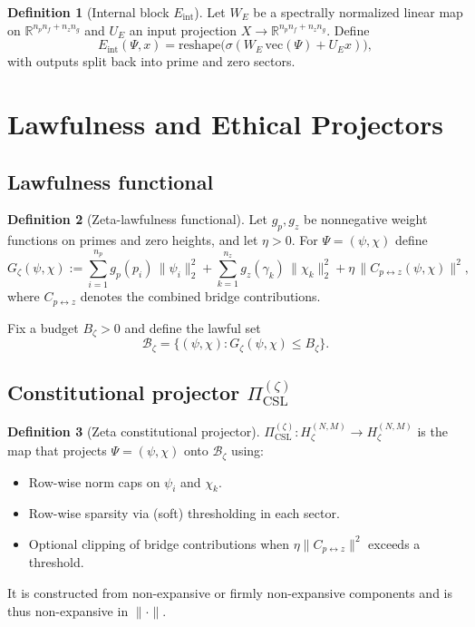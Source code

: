 \documentclass[11pt]{article}
\theoremstyle{definition}
\newtheorem{definition}{Definition}
\theoremstyle{plain}
\begin{document}
\begin{definition}[Internal block $E_{\mathrm{int}}$]
Let $W_E$ be a spectrally normalized linear map on $\mathbb{R}^{n_p n_f + n_z n_g}$ and $U_E$ an input projection $X \to \mathbb{R}^{n_p n_f + n_z n_g}$.
Define
\[
  E_{\mathrm{int}}(\Psi,x)
  = \mathrm{reshape}\bigl(\sigma(W_E\,\mathrm{vec}(\Psi) + U_E x)\bigr),
\]
with outputs split back into prime and zero sectors.
\end{definition}

\section{Lawfulness and Ethical Projectors}

\subsection{Lawfulness functional}

\begin{definition}[Zeta-lawfulness functional]
Let $g_p,g_z$ be nonnegative weight functions on primes and zero heights, and let $\eta>0$.
For $\Psi=(\psi,\chi)$ define
\[
  G_\zeta(\psi,\chi)
  :=
  \sum_{i=1}^{n_p} g_p(p_i)\,\|\psi_i\|_2^2
  + \sum_{k=1}^{n_z} g_z(\gamma_k)\,\|\chi_k\|_2^2
  + \eta\,\|C_{p\leftrightarrow z}(\psi,\chi)\|^2,
\]
where $C_{p\leftrightarrow z}$ denotes the combined bridge contributions.
\end{definition}

Fix a budget $B_\zeta>0$ and define the lawful set
\[
  \mathcal{B}_\zeta = \{(\psi,\chi) : G_\zeta(\psi,\chi)\le B_\zeta\}.
\]

\subsection{Constitutional projector \texorpdfstring{$\Pi_{\mathrm{CSL}}^{(\zeta)}$}{PiCSLz}}

\begin{definition}[Zeta constitutional projector]
$\Pi_{\mathrm{CSL}}^{(\zeta)} : H_\zeta^{(N,M)}\to H_\zeta^{(N,M)}$ is the map that projects $\Psi=(\psi,\chi)$ onto $\mathcal{B}_\zeta$ using:

\begin{itemize}[leftmargin=*]
  \item Row-wise norm caps on $\psi_i$ and $\chi_k$.
  \item Row-wise sparsity via (soft) thresholding in each sector.
  \item Optional clipping of bridge contributions when $\eta\|C_{p\leftrightarrow z}\|^2$ exceeds a threshold.
\end{itemize}

It is constructed from non-expansive or firmly non-expansive components and is thus non-expansive in $\|\cdot\|$.
\end{definition}
\end{document}
